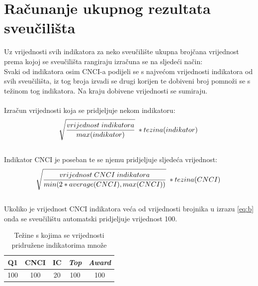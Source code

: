 \documentclass[times, utf8, zavrsni]{fer}
\begin{document}
\section{Računanje ukupnog rezultata sveučilišta}
Uz vrijednosti svih indikatora za neko sveučilište ukupna brojčana vrijednost prema kojoj se sveučilišta rangiraju izračuna 
se na sljedeći način:
\\Svaki od indikatora osim CNCI-a podijeli se s najvećom vrijednosti indikatora od svih sveučilišta, iz tog broja izvadi se
drugi korijen te dobiveni broj pomnoži se s težinom tog indikatora.
Na kraju dobivene vrijednosti se sumiraju.
\\
\\ Izračun vrijednosti koja se pridjeljuje nekom indikatoru: 
\begin{align}
    \sqrt[\leftroot{-2}]{\frac{vrijednost \; indikatora}{max(indikator)}} \; * tezina(indikator) \label{eq:a}
\end{align}
\\ Indikator CNCI je poseban te se njemu pridjeljuje sljedeća vrijednost: \\ 
\begin{align}
    \sqrt[\leftroot{-2}]{\frac{vrijednost \; CNCI \; indikatora}{min(2*average(CNCI), max(CNCI))}} \; * tezina(CNCI) \label{eq:b}
    \end{align}
\\ Ukoliko je vrijednost CNCI indikatora veća od vrijednosti brojnika u izrazu \ref{eq:b} onda se sveučilištu automatski pridjeljuje vrijednost 100.

\begin{table}[htb]
    \caption{Težine s kojima se vrijednosti pridružene indikatorima množe}
        \label{tbl:konstante3}
        \centering
        \begin{tabular}{ccccc} \hline
        Q1 & CNCI & IC & \emph{Top} & \emph{Award} \\ \hline
        100&100&20&100&100\\
        \end{tabular}
        \end{table}    
        \FloatBarrier
\end{document}
